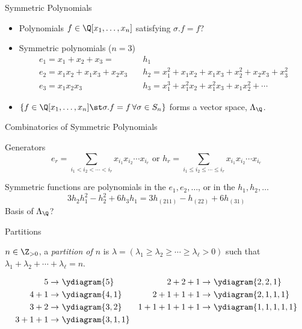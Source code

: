 \documentclass{beamer}
\newcommand{\sym}{\Lambda}
\newcounter{c}
\begin{document}
\begin{frame}{Symmetric Polynomials}
  \begin{itemize}
    \item Polynomials \(f \in \Q[x_1,\ldots,x_n]\) satisfying \(\sigma.f
    = f\)? \pause
  \item Symmetric polynomials (\(n=3\))
    \begin{align*}
      e_1 = x_1 + x_2 + x_3 = & h_1  \\
      e_2 = x_1 x_2 + x_1 x_3 + x_2 x_3 \quad & h_2 = x_1^2 + x_1 x_2 + x_1
                                          x_3 + x_2^2 +  x_2 x_3 +x_3^2  \\
      e_3 = x_1 x_2 x_3 \quad & h_3 = x_1^3 + x_1^2 x_2 + x_1^2 x_3 + x_1
                          x_2^2 + \cdots
    \end{align*} \pause
  \item \(\{f \in \Q[x_1,\ldots,x_n] \st \sigma.f = f \, \forall \sigma
    \in S_n\}\) forms a vector space, \(\sym_\Q\).
\end{itemize}
\end{frame}
\begin{frame}{Combinatorics of Symmetric Polynomials}
  \begin{block}{Generators}
    \[
      e_r =
      \sum_{i_1 < i_2 < \cdots < i_r} x_{i_1} x_{i_2} \cdots x_{i_r}
      \text { or }
      h_r = 
      \sum_{i_1 \leq i_2 \leq \cdots \leq i_r} x_{i_1} x_{i_2} \cdots x_{i_r}
    \]\pause 
  \end{block}
    Symmetric functions are polynomials in the \(e_1,e_2,\ldots\), or
    in the \(h_1,h_2,\ldots\) \[
     3 h_2 h_1^2 - h_2^2 + 6 h_3 h_1 = 3 h_{(211)} - h_{(22)} + 6 h_{(31)}
    \]
    \pause
    Basis of \(\sym_\Q\)?
\end{frame}
\begin{frame}{Partitions}
  \begin{definition}
    \(n \in \Z_{>0}\), a \emph{partition of \(n\)} is
    \(\lambda = (\lambda_1 \geq
    \lambda_2 \geq \cdots \geq \lambda_\ell > 0)\) such that
    \(\lambda_1+\lambda_2 + \cdots + \lambda_\ell = n \).
  \end{definition}\pause
  \begin{align*}
    5 \to &\ \ydiagram{5} & 
    2+2+1 \to&\ \ydiagram{2,2,1}\\
    4+1 \to &\ \ydiagram{4,1}&
    2+1+1+1 \to&\ \ydiagram{2,1,1,1} \\
    3+2 \to &\ \ydiagram{3,2}&
    1+1+1+1+1 \to&\ \ydiagram{1,1,1,1,1}\\
    3+1+1 \to &\ \ydiagram{3,1,1}
  \end{align*}
\end{frame}
\end{document}
